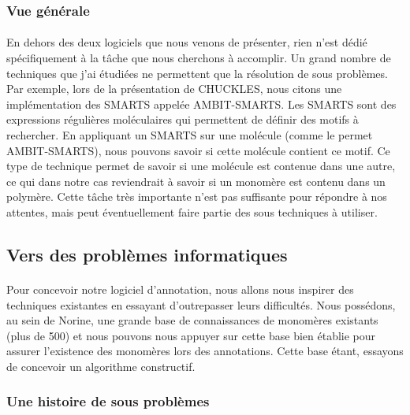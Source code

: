 \documentclass[12pt,french,twoside]{report}
\begin{document}
\subsubsection{Vue générale}

\paragraph{}En dehors des deux logiciels que nous venons de présenter, rien n'est dédié spécifiquement à la tâche que nous cherchons à accomplir.
Un grand nombre de techniques que j'ai étudiées ne permettent que la résolution de sous problèmes.
Par exemple, lors de la présentation de CHUCKLES, nous citons une implémentation des SMARTS appelée AMBIT-SMARTS.
Les SMARTS sont des expressions régulières moléculaires qui permettent de définir des motifs à rechercher.
En appliquant un SMARTS sur une molécule (comme le permet AMBIT-SMARTS), nous pouvons savoir si cette molécule contient ce motif.
Ce type de technique permet de savoir si une molécule est contenue dans une autre, ce qui dans notre cas reviendrait à savoir si un monomère est contenu dans un polymère.
Cette tâche très importante n'est pas suffisante pour répondre à nos attentes, mais peut éventuellement faire partie des sous techniques à utiliser.




\subsection{Vers des problèmes informatiques}

\paragraph{}Pour concevoir notre logiciel d'annotation, nous allons nous inspirer des techniques existantes en essayant d'outrepasser leurs difficultés.
Nous possédons, au sein de Norine, une grande base de connaissances de monomères existants (plus de 500) et nous pouvons nous appuyer sur cette base bien établie pour assurer l'existence des monomères lors des annotations.
Cette base étant, essayons de concevoir un algorithme constructif.


\subsubsection{Une histoire de sous problèmes}
\end{document}
